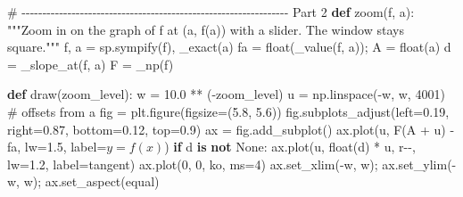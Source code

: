 \documentclass[
  letterpaper,
  DIV=11,
  numbers=noendperiod]{scrreprt}
\newenvironment{Shaded}{\begin{snugshade}}{\end{snugshade}}
\newcommand{\BuiltInTok}[1]{\textcolor[rgb]{0.00,0.23,0.31}{#1}}
\newcommand{\CommentTok}[1]{\textcolor[rgb]{0.37,0.37,0.37}{#1}}
\newcommand{\ControlFlowTok}[1]{\textcolor[rgb]{0.00,0.23,0.31}{\textbf{#1}}}
\newcommand{\DecValTok}[1]{\textcolor[rgb]{0.68,0.00,0.00}{#1}}
\newcommand{\FloatTok}[1]{\textcolor[rgb]{0.68,0.00,0.00}{#1}}
\newcommand{\KeywordTok}[1]{\textcolor[rgb]{0.00,0.23,0.31}{\textbf{#1}}}
\newcommand{\NormalTok}[1]{\textcolor[rgb]{0.00,0.23,0.31}{#1}}
\newcommand{\OperatorTok}[1]{\textcolor[rgb]{0.37,0.37,0.37}{#1}}
\newcommand{\StringTok}[1]{\textcolor[rgb]{0.13,0.47,0.30}{#1}}
\newcommand{\VariableTok}[1]{\textcolor[rgb]{0.07,0.07,0.07}{#1}}
\theoremstyle{plain}
\theoremstyle{plain}
\theoremstyle{definition}
\theoremstyle{definition}
\theoremstyle{definition}
\theoremstyle{plain}
\theoremstyle{plain}
\theoremstyle{remark}
\begin{document}
\begin{Shaded}
\begin{Highlighting}[]
\CommentTok{\# {-}{-}{-}{-}{-}{-}{-}{-}{-}{-}{-}{-}{-}{-}{-}{-}{-}{-}{-}{-}{-}{-}{-}{-}{-}{-}{-}{-}{-}{-}{-}{-}{-}{-}{-}{-}{-}{-}{-}{-}{-}{-}{-}{-}{-}{-}{-}{-}{-}{-}{-}{-}{-}{-}{-}{-}{-}{-}{-}{-}{-}{-}{-}{-} Part 2}
\KeywordTok{def}\NormalTok{ zoom(f, a):}
    \CommentTok{"""Zoom in on the graph of f at (a, f(a)) with a slider. The window stays square."""}
\NormalTok{    f, a }\OperatorTok{=}\NormalTok{ sp.sympify(f), \_exact(a)}
\NormalTok{    fa }\OperatorTok{=} \BuiltInTok{float}\NormalTok{(\_value(f, a))}\OperatorTok{;}\NormalTok{ A }\OperatorTok{=} \BuiltInTok{float}\NormalTok{(a)}
\NormalTok{    d }\OperatorTok{=}\NormalTok{ \_slope\_at(f, a)}
\NormalTok{    F }\OperatorTok{=}\NormalTok{ \_np(f)}

    \KeywordTok{def}\NormalTok{ draw(zoom\_level):}
\NormalTok{        w }\OperatorTok{=} \FloatTok{10.0} \OperatorTok{**}\NormalTok{ (}\OperatorTok{{-}}\NormalTok{zoom\_level)}
\NormalTok{        u }\OperatorTok{=}\NormalTok{ np.linspace(}\OperatorTok{{-}}\NormalTok{w, w, }\DecValTok{4001}\NormalTok{)               }\CommentTok{\# offsets from a}
\NormalTok{        fig }\OperatorTok{=}\NormalTok{ plt.figure(figsize}\OperatorTok{=}\NormalTok{(}\FloatTok{5.8}\NormalTok{, }\FloatTok{5.6}\NormalTok{))}
\NormalTok{        fig.subplots\_adjust(left}\OperatorTok{=}\FloatTok{0.19}\NormalTok{, right}\OperatorTok{=}\FloatTok{0.87}\NormalTok{, bottom}\OperatorTok{=}\FloatTok{0.12}\NormalTok{, top}\OperatorTok{=}\FloatTok{0.9}\NormalTok{)}
\NormalTok{        ax }\OperatorTok{=}\NormalTok{ fig.add\_subplot()}
\NormalTok{        ax.plot(u, F(A }\OperatorTok{+}\NormalTok{ u) }\OperatorTok{{-}}\NormalTok{ fa, lw}\OperatorTok{=}\FloatTok{1.5}\NormalTok{, label}\OperatorTok{=}\StringTok{\textquotesingle{}$y=f(x)$\textquotesingle{}}\NormalTok{)}
        \ControlFlowTok{if}\NormalTok{ d }\KeywordTok{is} \KeywordTok{not} \VariableTok{None}\NormalTok{:}
\NormalTok{            ax.plot(u, }\BuiltInTok{float}\NormalTok{(d) }\OperatorTok{*}\NormalTok{ u, }\StringTok{\textquotesingle{}r{-}{-}\textquotesingle{}}\NormalTok{, lw}\OperatorTok{=}\FloatTok{1.2}\NormalTok{, label}\OperatorTok{=}\StringTok{\textquotesingle{}tangent\textquotesingle{}}\NormalTok{)}
\NormalTok{        ax.plot(}\DecValTok{0}\NormalTok{, }\DecValTok{0}\NormalTok{, }\StringTok{\textquotesingle{}ko\textquotesingle{}}\NormalTok{, ms}\OperatorTok{=}\DecValTok{4}\NormalTok{)}
\NormalTok{        ax.set\_xlim(}\OperatorTok{{-}}\NormalTok{w, w)}\OperatorTok{;}\NormalTok{ ax.set\_ylim(}\OperatorTok{{-}}\NormalTok{w, w)}\OperatorTok{;}\NormalTok{ ax.set\_aspect(}\StringTok{\textquotesingle{}equal\textquotesingle{}}\NormalTok{)}

\end{Highlighting}
\end{Shaded}
\end{document}
